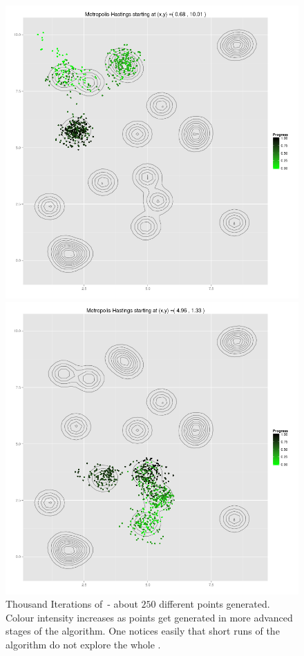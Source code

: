 \begin{figure}
	\begin{minipage}[b]{.5\linewidth}
		\centering \includegraphics[scale=.25]{./img/MH_simululation_1000_steps_ex1.png}
	\end{minipage}%
	\begin{minipage}[b]{.5\linewidth}
		\centering \includegraphics[scale=.25]{./img/MH_simululation_1000_steps_ex2.png}
	\end{minipage}
	\caption[Thousand Iterations of \MH]{Thousand Iterations of \MH\,- about $250$ different points generated. Colour intensity increases as points get generated in more advanced stages of the algorithm. One notices easily that short runs of the algorithm do not explore the whole \sspace.}\label{unexploredShort}
\end{figure}


